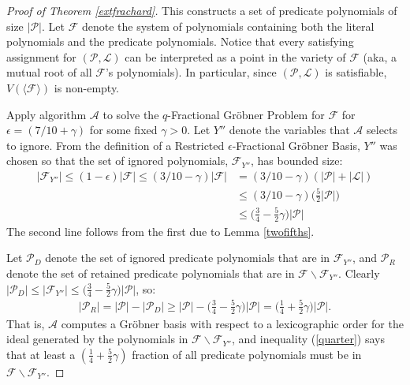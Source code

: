 \documentclass{article}
\newcommand{\ep}[0]{\epsilon}
\begin{document}
\begin{proof}[Proof of Theorem \ref{extfrachard}]
This constructs a set of predicate polynomials of size $|\mathcal{P}|$. Let $\mathcal{F}$ denote the system of polynomials containing both the literal polynomials and the predicate polynomials. Notice that every satisfying assignment for $(\mathcal{P},\mathcal{L})$ can be interpreted as a point in the variety of $\mathcal{F}$ (aka, a mutual root of all $\mathcal{F}$'s polynomials). In particular, since $(\mathcal{P},\mathcal{L})$ is satisfiable, $V(\langle \mathcal F \rangle)$ is non-empty.

Apply algorithm $\mathcal{A}$ to solve the $q$\nobreakdash-Fractional Gr\"{o}bner Problem for $\mathcal{F}$ for $\ep=(7/10+\gamma)$ for some fixed $\gamma>0$. Let $Y''$ denote the variables that $\mathcal{A}$ selects to ignore. From the definition of a Restricted $\ep$\nobreakdash-Fractional Gr\"{o}bner Basis, $Y''$ was chosen so that the set of ignored polynomials, $\mathcal{F}_{Y''}$, has bounded size:
\begin{align*}
|\mathcal{F}_{Y''}|\leq (1-\ep)|\mathcal{F}|\leq (3/10-\gamma)|\mathcal{F}|&=
(3/10-\gamma)(|\mathcal{P}|+|\mathcal{L}|)\\
&\leq (3/10-\gamma)\Big(\frac{5}{2}|\mathcal{P}|\Big)\\
&\leq \Big(\frac{3}{4}-\frac{5}{2}\gamma\Big)|\mathcal{P}|
\end{align*}
The second line follows from the first due to Lemma \ref{twofifths}. 

Let $\mathcal{P}_D$ denote the set of ignored predicate polynomials that are in $\mathcal{F}_{Y''}$, and $\mathcal{P}_R$ denote the set of retained predicate polynomials that are in $\mathcal{F}\backslash\mathcal{F}_{Y''}$. Clearly $|\mathcal{P}_D|\leq |\mathcal{F}_{Y''}|\leq \Big(\frac{3}{4}-\frac{5}{2}\gamma\Big)|\mathcal{P}|$, so:
\begin{align}\label{quarter}
|\mathcal{P}_R|= |\mathcal{P}|- |\mathcal{P}_D| \geq |\mathcal{P}|- \Big(\frac{3}{4}-\frac{5}{2}\gamma\Big)|\mathcal{P}|= \Big(\frac{1}{4}+\frac{5}{2}\gamma\Big)|\mathcal{P}|.
\end{align}That is, $\mathcal{A}$ computes a Gr\"{o}bner basis with respect to a lexicographic order for the ideal generated by the polynomials in $\mathcal{F}\backslash \mathcal{F}_{Y''}$, and inequality (\ref{quarter}) says that at least a $(\frac{1}{4}+\frac{5}{2}\gamma)$ fraction of all predicate polynomials must be in $\mathcal{F}\backslash \mathcal{F}_{Y''}$. 


\end{proof}
\end{document}
